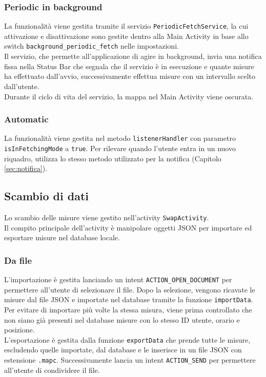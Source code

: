\documentclass[11pt]{article}
\begin{document}
\subsubsection{Periodic in background}
La funzionalità viene gestita tramite il servizio \texttt{PeriodicFetchService}, la cui attivazione e disattivazione sono gestite dentro alla Main Activity in base allo switch \texttt{background\_periodic\_fetch} nelle impostazioni. \\
Il servizio, che permette all'applicazione di agire in background, invia una notifica fissa nella Status Bar che segnala che il servizio è in esecuzione e quante misure ha effettuato dall'avvio, successivamente effettua misure con un intervallo scelto dall'utente. \\
Durante il ciclo di vita del servizio, la mappa nel Main Activity viene oscurata.
\subsubsection{Automatic}
La funzionalità viene gestita nel metodo \texttt{listenerHandler} con parametro \texttt{isInFetchingMode} a \texttt{true}. Per rilevare quando l'utente entra in un nuovo riquadro, utilizza lo stesso metodo utilizzato per la notifica (Capitolo \ref{sec:notifica}).
\subsection{Scambio di dati}
Lo scambio delle misure viene gestito nell'activity \texttt{SwapActivity}. \\
Il compito principale dell'activity è manipolare oggetti JSON per importare ed esportare misure nel database locale.
\subsubsection{Da file}
L'importazione è gestita lanciando un intent \texttt{ACTION\_OPEN\_DOCUMENT} per permettere all'utente di selezionare il file. Dopo la selezione, vengono ricavate le misure dal file JSON e importate nel database tramite la funzione \texttt{importData}. Per evitare di importare più volte la stessa misura, viene prima controllato che non siano già presenti nel database misure con lo stesso ID utente, orario e posizione. \\
L'esportazione è gestita dalla funzione \texttt{exportData} che prende tutte le misure, escludendo quelle importate, dal database e le inserisce in un file JSON con estensione \texttt{.mapc}. Successivamente lancia un intent \texttt{ACTION\_SEND} per permettere all'utente di condividere il file.
\end{document}
